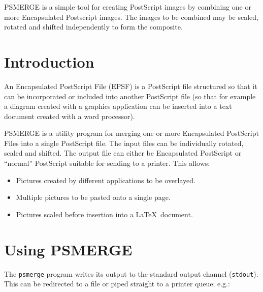 \documentclass[twoside,11pt]{article}
\newcommand{\stardocinitials}  {SUN}
\newcommand{\stardocnumber}    {164.2}
\newcommand{\stardocabstract}  {PSMERGE is a simple tool for creating
PostScript images by combining one or more Encapsulated Postscript images.
The images to be combined may be scaled, rotated and shifted
independently to form the composite.}
\newcommand{\stardocname}{\stardocinitials /\stardocnumber}
\newenvironment{latexonly}{}{}
\newcommand{\xlabel}[1]{}
\newcommand{\latexonlytoc}[0]{\tableofcontents}
\renewcommand{\thepage}{\roman{page}}
\begin{document}
\stardocabstract
  \newpage
  \begin{latexonly}
    \setlength{\parskip}{0mm}
    \latexonlytoc
    \setlength{\parskip}{\medskipamount}
    \markboth{\stardocname}{\stardocname}
  \end{latexonly}
\cleardoublepage
\renewcommand{\thepage}{\arabic{page}}
\setcounter{page}{1}


\section{\xlabel{introduction}Introduction}
\label{introduction}

An Encapsulated PostScript File (EPSF) is a PostScript file structured
so that it can be incorporated or included into another PostScript file
(so that for example a diagram created with a graphics application can
be inserted into a text document created with a word processor).

PSMERGE is a utility program for merging one or more Encapsulated
PostScript Files into a single PostScript file. The input files can be
individually rotated, scaled and shifted. The output file can either be
Encapsulated PostScript or ``normal'' PostScript suitable for sending
to a printer. This allows:

\begin{itemize}
\item Pictures created by different applications to be overlayed.
\item Multiple pictures to be pasted onto a single page.
\item Pictures scaled before insertion into a \LaTeX\ document.
\end{itemize}

\section{\xlabel{using_psmerge}Using PSMERGE}
\label{using_psmerge}

The \texttt{psmerge} program writes its output to the standard output channel
(\texttt{stdout}).  This can be redirected to a file or piped straight to a
printer queue; e.g.:
\end{document}
